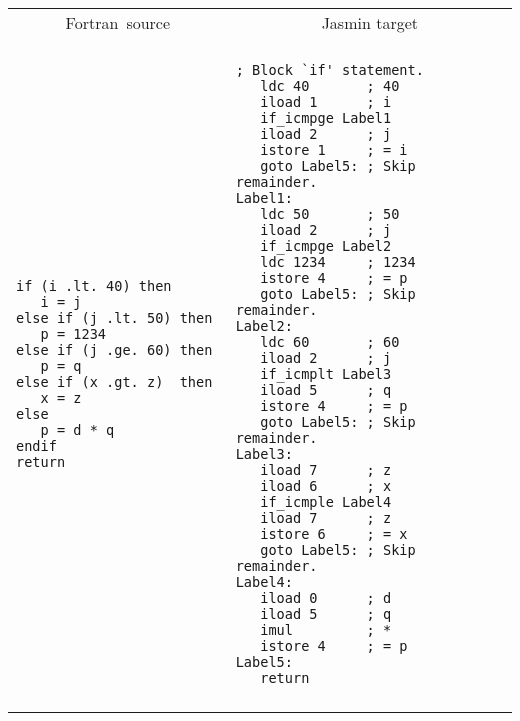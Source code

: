 \documentclass{article}
\begin{document}
{\newpage
\clearpage
\samepage \begin{tabular}{ll}\hline
\multicolumn{1}{c}{{\sc Fortran}\ source}
&  
\multicolumn{1}{c}{Jasmin target} \\ 
\\ \hline
\begin{minipage}[t]{2in}
\begin{verbatim}if (i .lt. 40) then
   i = j 
else if (j .lt. 50) then
   p = 1234
else if (j .ge. 60) then 
   p = q
else if (x .gt. z)  then 
   x = z
else 
   p = d * q
endif
return\end{verbatim}
\end{minipage}
&
\begin{minipage}[t]{3in}
\begin{verbatim}; Block `if' statement.
   ldc 40       ; 40
   iload 1      ; i
   if_icmpge Label1
   iload 2      ; j
   istore 1     ; = i
   goto Label5: ; Skip remainder.
Label1:
   ldc 50       ; 50
   iload 2      ; j
   if_icmpge Label2
   ldc 1234     ; 1234
   istore 4     ; = p
   goto Label5: ; Skip remainder.
Label2:
   ldc 60       ; 60
   iload 2      ; j
   if_icmplt Label3
   iload 5      ; q
   istore 4     ; = p
   goto Label5: ; Skip remainder.
Label3:
   iload 7      ; z
   iload 6      ; x
   if_icmple Label4
   iload 7      ; z
   istore 6     ; = x
   goto Label5: ; Skip remainder.
Label4:
   iload 0      ; d
   iload 5      ; q
   imul         ; *
   istore 4     ; = p
Label5:
   return\end{verbatim}
\end{minipage}\\ 
\\ \hline
\end{tabular}
}

\end{document}
